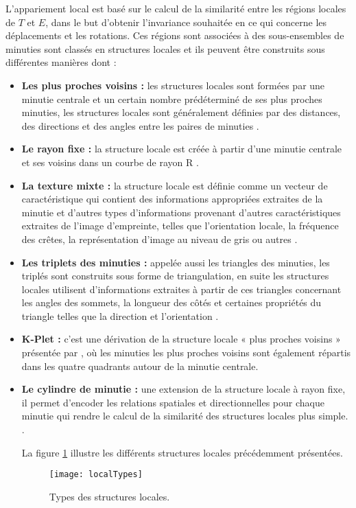	 L'appariement local est basé sur le calcul de la similarité entre les régions locales de $ T $ et $ E $, dans le but d'obtenir l'invariance souhaitée en ce qui concerne les déplacements et les rotations. Ces régions sont associées à des sous-ensembles de minuties sont classés en structures locales et ils peuvent être construits sous différentes manières dont :
	 	\begin{itemize}
	 	\item \textbf{Les plus proches voisins :} les structures locales sont formées par une minutie centrale et un certain nombre prédéterminé de ses plus proches minuties, les structures locales sont généralement définies par des distances, des directions et des angles entre les paires de minuties \citep{jiang2000fingerprint}.
	 	\item \textbf{Le rayon fixe :} la  structure locale est créée à partir d'une minutie centrale et ses voisins dans un courbe de rayon R \citep{ratha2000robust}.
	 	\item \textbf{La texture mixte :} la structure locale est définie comme un vecteur de caractéristique qui contient des informations appropriées extraites de la minutie et d'autres types d'informations provenant d'autres caractéristiques extraites de l'image d'empreinte, telles que l'orientation locale, la fréquence des crêtes, la représentation d'image au niveau de gris ou autres \citep{benhammadi2007fingerprint}.
	 	\item \textbf{Les triplets des minuties : }appelée aussi les triangles des minuties, les triplés sont construits sous forme de triangulation, en suite les structures locales utilisent d’informations extraites à partir de ces triangles concernant les angles des sommets, la longueur des côtés et certaines propriétés du triangle telles que la direction et l'orientation \citep{maltoni2009handbook}.
	 	\item \textbf{K-Plet :} c'est une dérivation de la structure locale «  plus proches voisins » présentée par \citep{chikkerur2006k}, où les minuties les plus proches voisins sont également répartis dans les quatre quadrants autour de la minutie centrale.
	 	 \item \textbf{Le cylindre de minutie :} une extension de la structure locale à rayon fixe, il permet d’encoder les relations spatiales et directionnelles pour chaque minutie qui rendre le calcul de la similarité des structures locales plus simple. \citep{cappelli2010minutia}.
	 	
	 	La figure \ref{fig:chapitre2localTypes} illustre les différents structures locales précédemment présentées.
	 	 
	 	 	\begin{figure}[H]
	 	 	\centering
	 	 	\texttt{[image: localTypes]}
	 	 	\caption{ Types des structures locales.}
	 	 	\label{fig:chapitre2localTypes}
	 	 \end{figure}
 	\end{itemize}	
